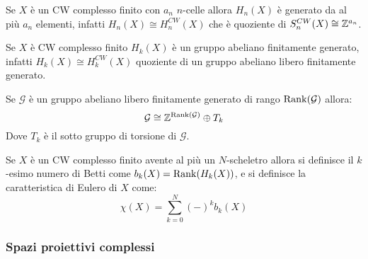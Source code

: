 \begin{osservation}
  Se $ X $ è un CW complesso finito con $ a_n $ $ n $-celle allora $ H_n(X) $ è
  generato da al più $ a_n $ elementi, infatti $ H_n(X) \cong H_n^{CW}(X) $ che è
  quoziente di $ S_n^{CW}(X) \cong \mathbb{Z}^{a_n} $.
\end{osservation}

\begin{corollary}
  Se $ X $ è CW complesso finito $ H_k(X) $ è un gruppo abeliano finitamente
  generato, infatti $ H_k(X) \cong H_k^{CW}(X) $ quoziente di un gruppo abeliano
  libero finitamente generato.
\end{corollary}

\begin{theorem}
  Se $ \mathcal{G} $ è un gruppo abeliano libero finitamente generato di rango
  $ \mathrm{Rank}( \mathcal{G} ) $ allora:
  \[
    \mathcal{G} \cong \mathbb{Z}^{\mathrm{Rank}( \mathcal{G} )} \oplus T_k
  \]
  Dove $ T_k $ è il sotto gruppo di torsione di $ \mathcal{G} $.
\end{theorem}

\begin{definition}
  Se $ X $ è un CW complesso finito avente al più un $ N $-scheletro allora si
  definisce il $ k $-esimo numero di Betti come $ b_k(X) = \mathrm{Rank}( H_k(X) ) $, e si
  definisce la caratteristica di Eulero di $ X $ come:
  \[
    \chi(X) = \sum_{k=0}^{N} (-)^k b_k(X)
  \]
\end{definition}

\subsubsection{Spazi proiettivi complessi}

